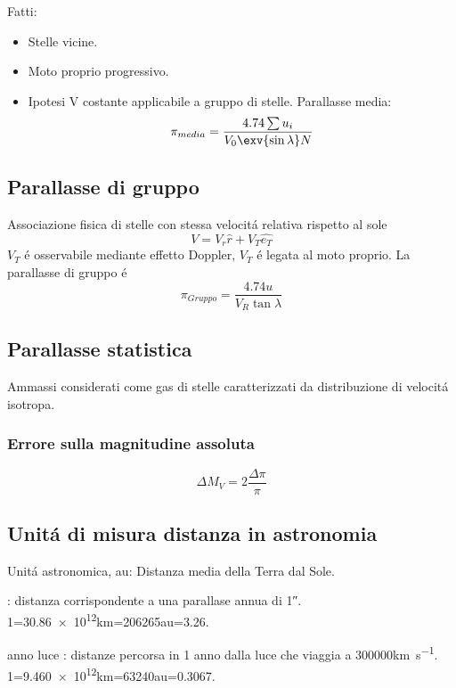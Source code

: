 Fatti:
\begin{itemize}
    \item Stelle vicine.
    \item Moto proprio progressivo.
    \item Ipotesi V costante applicabile a gruppo di stelle. Parallasse media: 
    \begin{equation*}
        \pi_{media}=\frac{4.74\sum u_i}{V_0\exv{\sin{\lambda}}N}
    \end{equation*}
\end{itemize}

\subsection{Parallasse di gruppo}

Associazione fisica di stelle con stessa velocit\'a relativa rispetto al sole
\begin{equation*}
    V=V_r\hat{r}+V_T\hat{e_T}
\end{equation*}
$V_T$ \'e osservabile mediante effetto Doppler, $V_T$ \'e legata al moto proprio. La parallasse di gruppo \'e 
\begin{equation*}
    \pi_{Gruppo}=\frac{4.74u}{V_R\tan{\lambda}}
\end{equation*}

\subsection{Parallasse statistica}

Ammassi considerati come gas di stelle caratterizzati da distribuzione di velocit\'a isotropa.

\subsubsection{Errore sulla magnitudine assoluta}

\begin{equation*}
    \Delta M_V=2\frac{\Delta\pi}{\pi}
\end{equation*}

\subsection{Unit\'a di misura distanza in astronomia}

\begin{itemize*}
\item Unit\'a astronomica, \si{\astronomicalunit}: Distanza media della Terra dal Sole.
\item \si{\parsec}: distanza corrispondente a una parallase annua di \ang{;;1}.
1\si{\parsec}=\num{30,86e12}\si{\kilo\meter}=\num{206265}\si{\astronomicalunit}=\num{3.26}\si{\lightyear}.
\item anno luce \si{\lightyear}: distanze percorsa in 1 anno dalla luce che viaggia a \num{300000}\si{\kilo\meter\per\second}.
1\si{\lightyear}=\num{9.460e12}\si{\kilo\meter}=\num{63240}\si{\astronomicalunit}=\num{0.3067}\si{\parsec}.
\end{itemize*}

